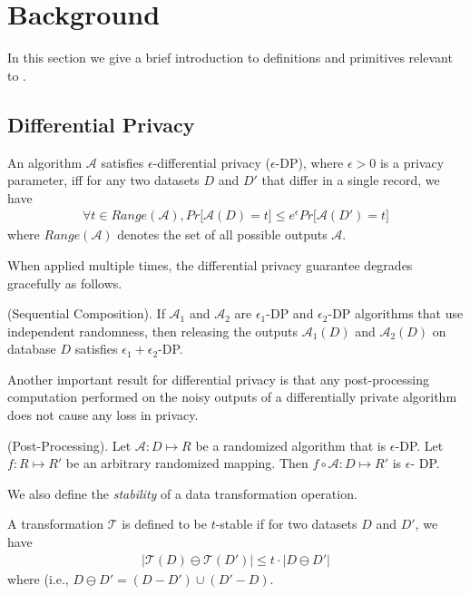 
\section{Background}
In this section we give a brief introduction to definitions and primitives relevant to \system. 

\subsection{Differential Privacy}
\begin{definition} An algorithm $\mathcal{A}$
satisfies $\epsilon$-differential privacy ($\epsilon$-DP), where $\epsilon > 0$ is a privacy parameter, iff
 for any two datasets $D$ and $D'$ that differ in a single record, we have
\begin{gather}
\forall t \in Range(\mathcal{A}), Pr \big[\mathcal{A}(D) = t\big] \leq e^{\epsilon}Pr\big[\mathcal{A}(D') = t\big]
\end{gather}
where $Range(\mathcal{A})$ denotes the set of all possible outputs
$\mathcal{A}$.
\end{definition} 
When applied multiple times, the differential privacy guarantee degrades gracefully as follows.
\begin{theorem}(Sequential Composition). If $\mathcal{A}_1$ and
$\mathcal{A}_2$ are $\epsilon_1$-DP and $\epsilon_2$-DP algorithms that use independent randomness, then releasing the outputs $\mathcal{A}_1(D)$ and
$\mathcal{A}_2(D)$ on database $D$ satisfies $\epsilon_1+\epsilon_2$-DP.\end{theorem} 
Another important result for differential privacy is that any post-processing computation performed on the noisy outputs of a differentially private algorithm does not cause any loss in privacy.
\begin{theorem}(Post-Processing). Let $\mathcal{A}: D \mapsto R$ be a randomized
algorithm that is $\epsilon$-DP. Let $f : R \mapsto R'$ be an
arbitrary randomized mapping. Then $f \circ \mathcal{A} : D \mapsto R'$ is $\epsilon$-
DP. \label{post}\end{theorem}
We also define the \emph{stability} of a data transformation operation.
\begin{definition}A transformation $\mathcal{T}$ is defined to be $t$-stable if for two datasets $D$ and $D'$, we have\begin{gather}|\mathcal{T}(D)\ominus \mathcal{T}(D')| \leq t \cdot |D\ominus D'|  \end{gather} where  (i.e.,  $D \ominus D' = (D-D') \cup (D'-D)$. \end{definition}
